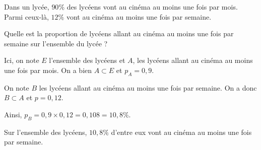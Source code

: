 \documentclass[10pt,openright,twoside,french]{book}
\begin{document}
\begin{Exemple}
    Dans un lycée, $90\%$ des lycéens vont au cinéma au moins une fois par mois. Parmi ceux-là, $12\%$ vont au cinéma au moins une fois par semaine.\par
    Quelle est la proportion de lycéens allant au cinéma au moins une fois par semaine sur l'ensemble du lycée ?\medskip
    
    Ici, on note $E$ l'ensemble des lycéens et $A$, les lycéens allant au cinéma au moins une fois par mois. On a bien $A \subset E$ et $p_A = 0,9$.\par
    On note $B$ les lycéens allant au cinéma au moins une fois par semaine. On a donc $B \subset A$ et $p = 0,12$.\par
    Ainsi, $p_B = 0,9 \times 0,12 = 0,108 = 10,8\%$.\medskip
    
    Sur l'ensemble des lycéens, $10,8\%$ d'entre eux vont au cinéma au moins une fois par semaine.
\end{Exemple}
\end{document}
